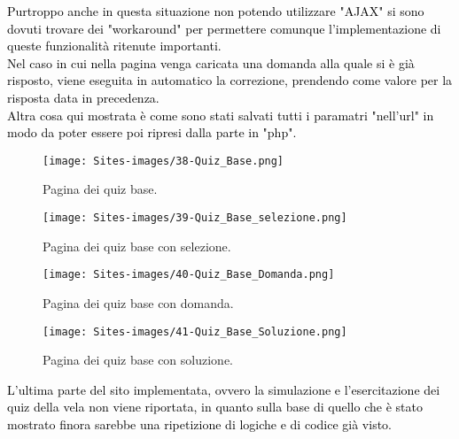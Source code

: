 
\begin{minipage}{\textwidth}
	\textcolor{black}{Purtroppo anche in questa situazione non potendo utilizzare "AJAX" si sono dovuti trovare dei "workaround" per permettere comunque l'implementazione di queste funzionalità ritenute importanti.\\
	Nel caso in cui nella pagina venga caricata una domanda alla quale si è già risposto, viene eseguita in automatico la correzione, prendendo come valore per la risposta data in precedenza.\\
	Altra cosa qui mostrata è come sono stati salvati tutti i paramatri "nell'url" in modo da poter essere poi ripresi dalla parte in "php".}\\
\end{minipage}\leavevmode\newpage

\begin{minipage}{\textwidth}
\begin{figure}[H]
	\begin{center}
		\texttt{[image: Sites-images/38-Quiz\_Base.png]}
		\caption{Pagina dei quiz base.}
	\end{center}
\end{figure}


\begin{figure}[H]
	\begin{center}
		\texttt{[image: Sites-images/39-Quiz\_Base\_selezione.png]}
		\caption{Pagina dei quiz base con selezione.}
	\end{center}
\end{figure}

\begin{figure}[H]
	\begin{center}
		\texttt{[image: Sites-images/40-Quiz\_Base\_Domanda.png]}
		\caption{Pagina dei quiz base con domanda.}
	\end{center}
\end{figure}
\end{minipage}

\begin{minipage}{\textwidth}
\begin{figure}[H]
	\begin{center}
		\texttt{[image: Sites-images/41-Quiz\_Base\_Soluzione.png]}
		\caption{Pagina dei quiz base con soluzione.}
	\end{center}
\end{figure}
\end{minipage}

\textcolor{black}{L'ultima parte del sito implementata, ovvero la simulazione e l'esercitazione dei quiz della vela non viene riportata, in quanto sulla base di quello che è stato mostrato finora sarebbe una ripetizione di logiche e di codice già visto.} 